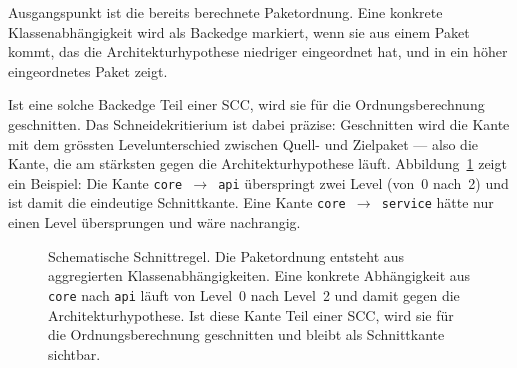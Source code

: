 \documentclass[a4paper,11pt]{article}
\begin{document}
Ausgangspunkt ist die bereits berechnete Paketordnung. Eine konkrete
Klassenabh\"angigkeit wird als Backedge markiert, wenn sie aus einem Paket
kommt, das die Architekturhypothese niedriger eingeordnet hat, und in ein
h\"oher eingeordnetes Paket zeigt.

Ist eine solche Backedge Teil einer SCC, wird sie f\"ur die
Ordnungsberechnung geschnitten. Das Schneidekritierium ist dabei pr\"azise:
Geschnitten wird die Kante mit dem gr\"ossten Levelunterschied zwischen
Quell- und Zielpaket --- also die Kante, die am st\"arksten gegen die
Architekturhypothese l\"auft. Abbildung~\ref{fig:cut-rule} zeigt ein
Beispiel: Die Kante \texttt{core $\to$ api} \"uberspringt zwei Level
(von~0 nach~2) und ist damit die eindeutige Schnittkante. Eine Kante
\texttt{core $\to$ service} h\"atte nur einen Level \"ubersprungen und
w\"are nachrangig.

\begin{figure}[htbp]
  \centering
  \caption{Schematische Schnittregel. Die Paketordnung entsteht aus
  aggregierten Klassenabh\"angigkeiten. Eine konkrete Abh\"angigkeit aus
  \texttt{core} nach \texttt{api} l\"auft von Level~0 nach Level~2 und damit
  gegen die Architekturhypothese. Ist diese Kante Teil einer SCC, wird sie
  f\"ur die Ordnungsberechnung geschnitten und bleibt als Schnittkante
  sichtbar.}
  \label{fig:cut-rule}
\end{figure}
\end{document}
